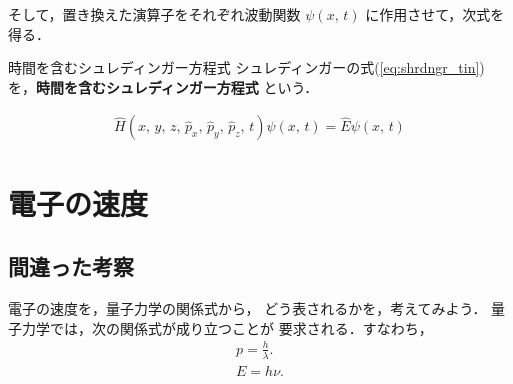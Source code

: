                 そして，置き換えた演算子をそれぞれ波動関数 $\psi(x,\,t)$ に作用させて，次式を得る．
                        \begin{myshadebox}{時間を含むシュレディンガー方程式}
                          シュレディンガーの式(\ref{eq:shrdngr_tin})を，\textbf{時間を含むシュレディンガー方程式} という．

                            \begin{align}\label{eq:shrdngr_tin}
                              \hat{H}\left(x,\,y,\,z,\,\hat{p}_{x},\,\hat{p}_{y},\,\hat{p}_{z},\,t\right)\psi(x,\,t)=\hat{E}\psi(x,\,t)
                            \end{align}
                        \end{myshadebox}

    \section{電子の速度}

            \subsection{間違った考察}
                電子の速度を，量子力学の関係式から，
                どう表されるかを，考えてみよう．
                量子力学では，次の関係式が成り立つことが
                要求される．すなわち，
                    \begin{align}
                        p   =   \frac{h}{\lambda }.  \\
                        E   =   h\nu.
                    \end{align}


